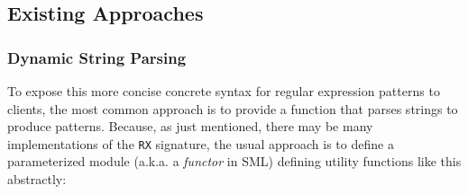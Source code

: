 

\subsection{Existing Approaches}\label{sec:syntax-existing}\label{sec:syntax-existing-approaches}
\subsubsection{Dynamic String Parsing}
To expose this more concise concrete syntax for regular expression patterns to clients, the most common approach is to provide a function that parses strings to produce patterns. Because, as just mentioned, there  may be many implementations of the \lstinline{RX} signature, the usual approach is to define a parameterized module (a.k.a. a \emph{functor} in SML) defining utility functions like this abstractly:

